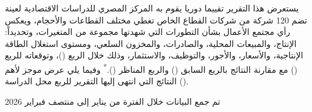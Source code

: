 يستعرض هذا التقرير تقييما دوريا يقوم به المركز المصري للدراسات الاقتصادية لعينة تضم 120 شركة من شركات القطاع الخاص تغطي مختلف القطاعات والأحجام، ويعكس رأي مجتمع الأعمال بشأن التطورات التي شهدتها مجموعة من المتغيرات، وتحديداً: الإنتاج، والمبيعات المحلية، والصادرات، والمخزون السلعي، ومستوى استغلال الطاقة الإنتاجية، والأسعار، والأجور، والتوظيف، والاستثمار، وذلك خلال الربع (\CurrentQuarterText)، وتوقعاته للربع (\NextQuarterText) مع مقارنة النتائج بالربع السابق (\PreviousQuarterText) والربع المناظر (\CorrespQuarterText).\textsuperscript{*} وفيما يلي عرض موجز لأهم النتائج التي انتهى إليها التقرير للربع محل الدراسة (\CurrentQuarterText).

\vspace{0.3em}
{\footnotesize * تم جمع البيانات خلال الفترة من يناير إلى منتصف فبراير 2026}
